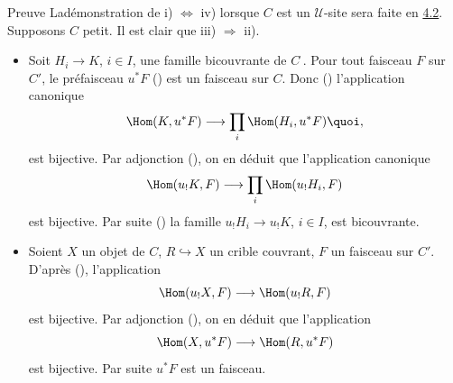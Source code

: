 \begin{enonce*}[remark]{Preuve}
La\pageoriginale démonstration de i) $\Leftrightarrow$ iv)
lorsque $C$ est un $𝒰$-site sera faite en
\hyperref[III.subsec4.2]{4.2}. Supposons $C$ petit. Il est clair que iii)
$\Rightarrow$ ii).
\begin{itemize}
\item[i) $\Rightarrow$ iii):] Soit $H_i\rightarrow K$, $i\in I$, une
  famille bicouvrante de $C^{\widehat{\phantom{,}}}$. Pour tout
  faisceau $F$ sur $C'$, le préfaisceau $u^\ast F$ () est un
  faisceau sur $C$. Donc () l'application canonique
$$
\Hom(K, u^\ast F)\longrightarrow \prod_i \Hom(H_i, u^\ast F){\quoi},
$$
est bijective. Par adjonction (), on en déduit que
l'application canonique
$$
\Hom(u_{!}K,F)\longrightarrow \prod_i \Hom(u_{!}H_i, F)
$$
est bijective. Par suite () la famille
$u_{!}H_i\rightarrow u_{!}K$, $i\in I$, est bicouvrante.

\item[ii) $\Rightarrow$ i):] Soient $X$ un objet de $C$,
  $R\hookrightarrow X$ un crible couvrant, $F$ un faisceau sur
  $C'$. D'après (), l'application
$$
\Hom(u_{!}X,F)\longrightarrow \Hom(u_{!}R,F)
$$
est bijective. Par adjonction (), on en déduit que
l'application
$$
\Hom(X,u^\ast F)\longrightarrow \Hom(R, u^\ast F)
$$
est bijective. Par suite $u^\ast F$ est un faisceau.


\end{itemize}
\end{enonce*}
